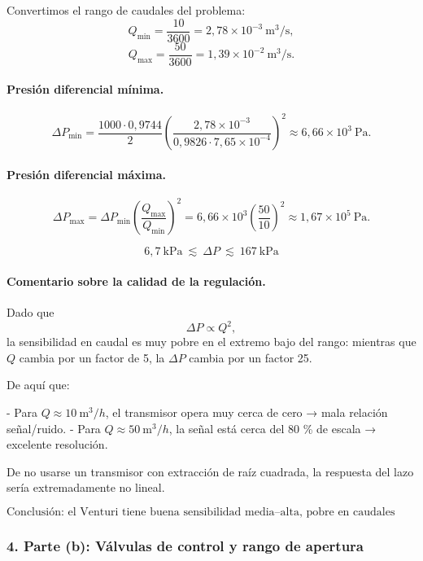 \documentclass[12pt, a4paper]{article}
\begin{document}
Convertimos el rango de caudales del problema:
\[
Q_{\min} = \frac{10}{3600} = 2{,}78\times 10^{-3}\ \text{m}^3/\text{s},
\]
\[
Q_{\max} = \frac{50}{3600} = 1{,}39\times 10^{-2}\ \text{m}^3/\text{s}.
\]

\paragraph{Presión diferencial mínima.}
\[
\Delta P_{\min} =
\frac{1000\cdot 0{,}9744}{2}
\left(\frac{2{,}78\times 10^{-3}}
           {0{,}9826\cdot 7{,}65\times 10^{-4}}\right)^2
\approx 6{,}66\times 10^{3}\ \text{Pa}.
\]

\paragraph{Presión diferencial máxima.}
\[
\Delta P_{\max}
= \Delta P_{\min}
  \left(\frac{Q_{\max}}{Q_{\min}}\right)^2
= 6{,}66\times 10^3 \left(\frac{50}{10}\right)^2
\approx 1{,}67\times 10^{5}\ \text{Pa}.
\]

\[
\boxed{
6{,}7\ \text{kPa}\ \lesssim\ \Delta P\ \lesssim\ 167\ \text{kPa}
}
\]


\paragraph{Comentario sobre la calidad de la regulación.}

Dado que 
\[
\Delta P \propto Q^2,
\]
la sensibilidad en caudal es muy pobre en el extremo bajo del rango:
mientras que $Q$ cambia por un factor de 5, la $\Delta P$ cambia por un factor 25.

De aquí que:

- Para $Q\approx 10\ \text{m}^3/h$, el transmisor opera muy cerca de cero → mala relación señal/ruido.
- Para $Q\approx 50\ \text{m}^3/h$, la señal está cerca del 80 \% de escala → excelente resolución.

De no usarse un transmisor con extracción de raíz cuadrada, la respuesta del lazo
sería extremadamente no lineal.

\[
\text{Conclusión: el Venturi tiene buena sensibilidad media–alta, pobre en caudales bajos.}
\]

\subsubsection*{4. Parte (b): Válvulas de control y rango de apertura}
\end{document}
